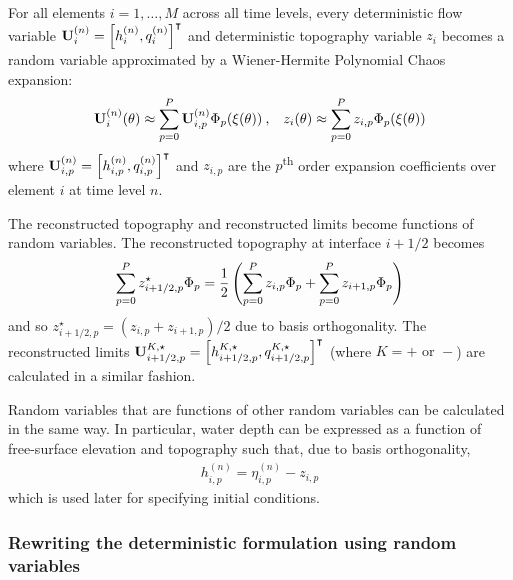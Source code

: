 For all elements $i=1, \ldots, M$ across all time levels, every deterministic flow variable $\mathbf{U}_i^{(n)} = \left[h_i^{(n)}, q_i^{(n)}\right]^\intercal$ and deterministic topography variable $z_i$ becomes a random variable approximated by a Wiener-Hermite Polynomial Chaos expansion:
\begin{align}
\flow_i^{(n)}(\theta) \approx \sum _{p=0}^P \flow_{i,p}^{(n)} \pcbasis_p(\xi(\theta))
    \:\text{,}\quad
z_i(\theta) \approx \sum_{p=0}^P z_{i,p} \pcbasis_p(\xi(\theta))
\label{eqn:pc-expansion}%
\end{align}
where $\mathbf{U}_{i,p}^{(n)} = \left[ h_{i,p}^{(n)}, q_{i,p}^{(n)} \right]^\intercal$ and $z_{i,p}$ are the $p$\textsuperscript{th} order expansion coefficients over element $i$ at time level $n$.

The reconstructed topography and reconstructed limits become functions of random variables.
The reconstructed topography at interface $i+1/2$ becomes
\begin{align}
	\sum_{p=0}^P z^\star_{i+1/2,p} \Phi_p
	=
	\frac{1}{2}
	\left(
	\sum_{p=0}^P z_{i,p} \Phi_p
	+
	\sum_{p=0}^P z_{i+1,p} \Phi_p
	\right)
\end{align}
and so $z^\star_{i+1/2,p} = (z_{i,p} + z_{i+1,p})/2$ due to basis orthogonality.
The reconstructed limits $\mathbf{U}^{K,\star}_{i+1/2,p} = \left[ h^{K,\star}_{i+1/2,p}, q^{K,\star}_{i+1/2,p} \right]^\intercal$ (where $K = + \text{ or } -$) are calculated in a similar fashion.

Random variables that are functions of other random variables can be calculated in the same way.
In particular, water depth can be expressed as a function of free-surface elevation and topography such that, due to basis orthogonality,
\begin{align}
h_{i,p}^{(n)} = \eta_{i,p}^{(n)} - z_{i,p}
\label{eqn:h-eta-z}
\end{align}
which is used later for specifying initial conditions.

\subsubsection*{Rewriting the deterministic formulation using random variables}

